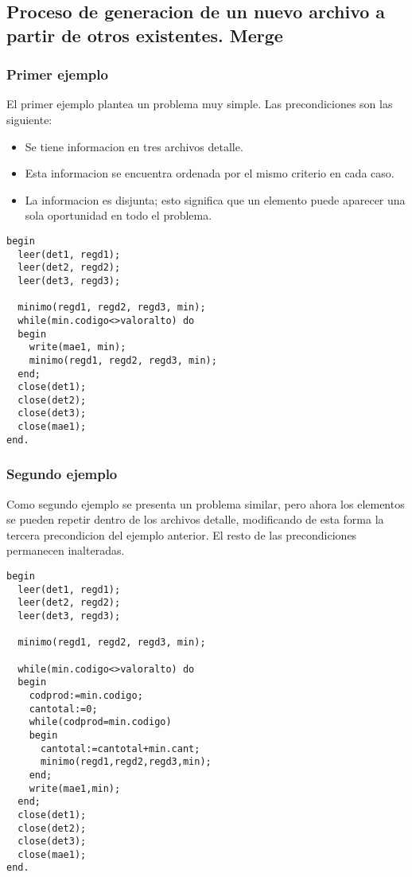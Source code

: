 \subsection{Proceso de generacion de un nuevo archivo a partir de otros existentes. Merge}

\subsubsection{Primer ejemplo}

El primer ejemplo plantea un problema muy simple. Las precondiciones son las siguiente:
\begin{itemize}
    \item Se tiene informacion en tres archivos detalle.
    \item Esta informacion se encuentra ordenada por el mismo criterio en cada caso.
    \item La informacion es disjunta; esto significa que un elemento puede aparecer una sola oportunidad en todo el problema.
\end{itemize}

\begin{lstlisting}
begin
  leer(det1, regd1);
  leer(det2, regd2);
  leer(det3, regd3);

  minimo(regd1, regd2, regd3, min);
  while(min.codigo<>valoralto) do
  begin
    write(mae1, min);
    minimo(regd1, regd2, regd3, min);
  end;
  close(det1);
  close(det2);
  close(det3);
  close(mae1);
end.
\end{lstlisting}

\subsubsection{Segundo ejemplo}
Como segundo ejemplo se presenta un problema similar, pero ahora los elementos se pueden repetir dentro de los archivos detalle, modificando de esta forma la tercera precondicion del ejemplo anterior. El resto de las precondiciones permanecen inalteradas.

\begin{lstlisting}
begin
  leer(det1, regd1);
  leer(det2, regd2);
  leer(det3, regd3);

  minimo(regd1, regd2, regd3, min);

  while(min.codigo<>valoralto) do
  begin
    codprod:=min.codigo;
    cantotal:=0;
    while(codprod=min.codigo)
    begin
      cantotal:=cantotal+min.cant;
      minimo(regd1,regd2,regd3,min);
    end;
    write(mae1,min);
  end;
  close(det1);
  close(det2);
  close(det3);
  close(mae1);
end.
\end{lstlisting}

